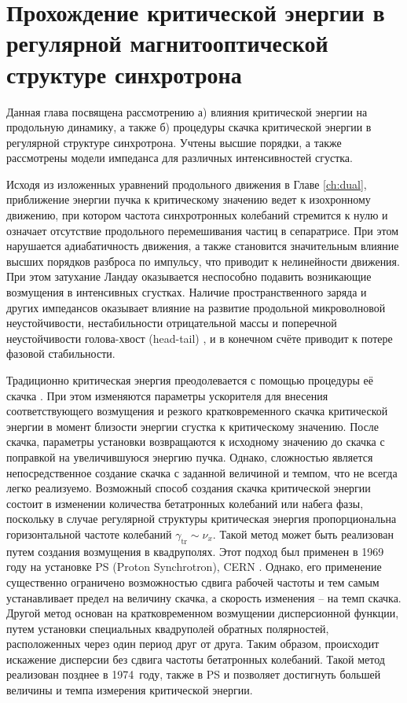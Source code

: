 
	\chapter{Прохождение критической энергии в регулярной магнитооптической структуре синхротрона}\label{ch:transition}

\par Данная глава посвящена рассмотрению а) влияния критической энергии на продольную динамику, а также б) процедуры скачка критической энергии в регулярной структуре синхротрона. Учтены высшие порядки, а также рассмотрены модели импеданса для различных интенсивностей сгустка.

\par Исходя из изложенных уравнений продольного движения в Главе \ref{ch:dual}, приближение энергии пучка к критическому значению ведет к изохронному движению, при котором частота синхротронных колебаний стремится к нулю и означает отсутствие продольного перемешивания частиц в сепаратрисе. При этом нарушается адиабатичность движения, а также становится значительным влияние высших порядков разброса по импульсу, что приводит к нелинейности движения. При этом затухание Ландау оказывается неспособно подавить возникающие возмущения в интенсивных сгустках. Наличие пространственного заряда и других импедансов оказывает влияние на развитие продольной микроволновой неустойчивости, нестабильности отрицательной массы и поперечной неустойчивости голова-хвост (head-tail) \cite{ng}, \cite{MetralMohl} и в конечном счёте приводит к потере фазовой стабильности.

\par	Традиционно критическая энергия преодолевается с помощью процедуры её скачка \cite{risselada:jump}. При этом изменяются параметры ускорителя для внесения соответствующего возмущения и резкого кратковременного скачка критической энергии в момент близости энергии сгустка к критическому значению. После скачка, параметры установки возвращаются к исходному значению до скачка с поправкой на увеличившуюся энергию пучка. Однако, сложностью является непосредственное создание скачка с заданной величиной и темпом, что не всегда легко реализуемо. Возможный способ создания скачка критической энергии состоит в изменении количества бетатронных колебаний или набега фазы, поскольку в случае регулярной структуры критическая энергия пропорциональна горизонтальной частоте колебаний $\gamma_{\text{tr}} \sim \nu_{x}$. Такой метод может быть реализован путем создания возмущения в квадруполях. Этот подход был применен в 1969 году на установке PS (Proton Synchrotron), CERN \cite{cern:q-jump}. Однако, его применение существенно ограничено возможностью сдвига рабочей частоты и тем самым устанавливает предел на величину скачка, а скорость изменения -- на темп скачка. Другой метод основан на кратковременном возмущении дисперсионной функции, путем установки специальных квадруполей обратных полярностей, расположенных через один период друг от друга.  Таким образом, происходит искажение дисперсии без сдвига частоты бетатронных колебаний. Такой метод реализован позднее в 1974~году, также в PS \cite{cern:new-jump} и позволяет достигнуть большей величины и темпа измерения критической энергии.

